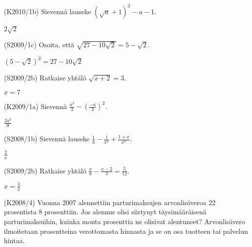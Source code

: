 \begin{tehtava}(K2010/1b) Sievennä lauseke $ (\sqrt{a} + 1)^2 - a - 1 $.
\begin{vastaus}
				$2\sqrt{2}$
				\end{vastaus}
\end{tehtava}

\begin{tehtava}(S2009/1c) Osoita, että $\sqrt{27 - 10 \sqrt{2}} = 5 - \sqrt{2} $.
\begin{vastaus}
				$(5-\sqrt{2})^2=27-10\sqrt{2}$ %
				\end{vastaus}
\end{tehtava}

\begin{tehtava}(S2009/2b) Ratkaise yhtälö $ \sqrt{x + 2 } = 3$.
\begin{vastaus}
				$x=7$
				\end{vastaus}
\end{tehtava}

\begin{tehtava}(K2009/1a) Sievennä $ \frac{a^2}{3} - \left( \frac{-a}{3} \right)^2 $.
\begin{vastaus}
				$\frac{2a^2}{9}$
				\end{vastaus}
\end{tehtava}

\begin{tehtava}(S2008/1b) Sievennä lauseke $\frac{1}{x} - \frac{1}{x^2} + \frac{1 + x}{x^2}$.
                        \begin{vastaus}
				$\frac{2}{x}$
				\end{vastaus}
\end{tehtava}

\begin{tehtava}(S2009/2b) Ratkaise yhtälö $\frac{x}{6} - \frac{x - 2}{3} = \frac{5}{12}$.
                        \begin{vastaus}
				$x=\frac{3}{2}$
				\end{vastaus}
\end{tehtava}

\begin{tehtava}(K2008/4) Vuonna 2007 alennettiin parturimaksujen arvonlisäveroa $22$ prosentista $8$ prosenttiin. Jos alennus olisi siirtynyt täysimääräisenä parturimaksuihin, kuinka monta prosenttia ne olisivat alentuneet? Arvonlisävero ilmoitetaan prosentteina verottomasta hinnasta ja se on osa tuotteen tai palvelun hintaa.
\end{tehtava}

